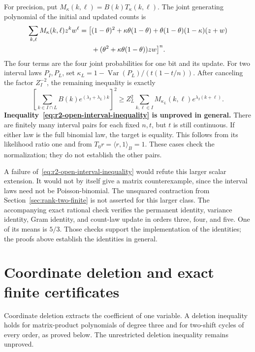 \documentclass[11pt,a4paper]{article}
\theoremstyle{definition}
\theoremstyle{remark}
\begin{document}
For precision, put $M_\kappa(k,\ell)=B(k)T_\kappa(k,\ell)$.
The joint generating polynomial of the initial and updated counts is
\begin{align}\label{eq:r2-joint-kernel}
 \sum_{k,\ell}M_\kappa(k,\ell)z^kw^\ell
 =\bigl[&(1-\theta)^2+\kappa\theta(1-\theta)
 +\theta(1-\theta)(1-\kappa)(z+w)\notag\\
 &+(\theta^2+\kappa\theta(1-\theta))zw\bigr]^n.
\end{align}
The four terms are the four joint probabilities for one bit and its update.
For two interval laws $P_I,P_L$, set
$\kappa_L=1-\operatorname{Var}(P_L)/(t(1-t/n))$.
After canceling the factor $Z_I^{-2}$, the remaining inequality is exactly
\begin{equation}\label{eq:r2-open-interval-inequality}
 \left[\sum_{k\in I\cap L}B(k)e^{(\lambda_I+\lambda_L)k}\right]^2
 \ge Z_L^2\sum_{k,\ell\in I}M_{\kappa_L}(k,\ell)e^{\lambda_I(k+\ell)}.
\end{equation}
\textbf{Inequality~\eqref{eq:r2-open-interval-inequality} is unproved in general.}
There are finitely many interval pairs for each fixed $n,t$, but $t$ is still continuous.
If either law is the full binomial law, the target is equality.
This follows from its likelihood ratio one and from $T_0r=\langle r,1\rangle_B=1$.
These cases check the normalization; they do not establish the other pairs.

A failure of~\eqref{eq:r2-open-interval-inequality} would refute this larger scalar extension.
It would not by itself give a matrix counterexample, since the interval laws need not be Poisson-binomial.
The unsquared contraction from Section~\ref{sec:rank-two-finite} is not asserted for this larger class.
The accompanying exact rational check verifies the permanent identity, variance identity, Gram identity, and count-law update in orders three, four, and five.
One of its means is $5/3$.
Those checks support the implementation of the identities; the proofs above establish the identities in general.


\section{Coordinate deletion and exact finite
certificates}\label{sec:deletion}

Coordinate deletion extracts the coefficient of one variable.
A deletion inequality holds for matrix-product polynomials of degree three and for two-shift cycles of every order, as proved below.
The unrestricted deletion inequality remains unproved.
\end{document}
